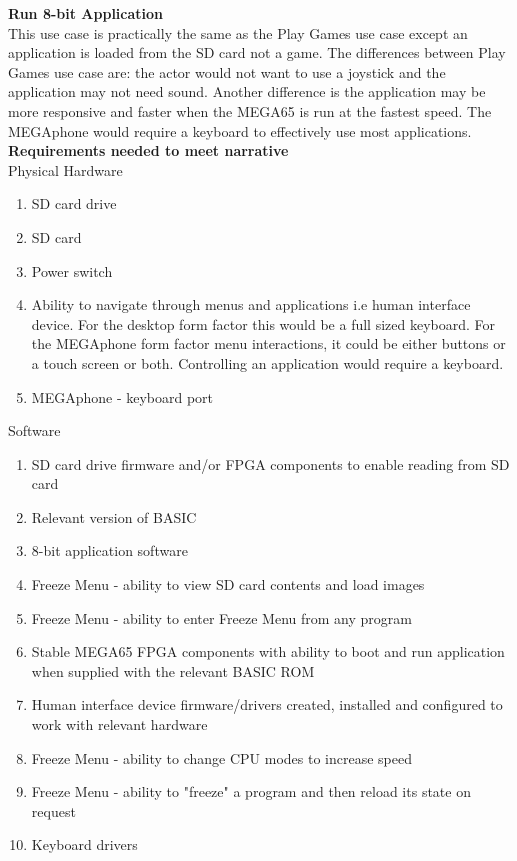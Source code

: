 \textbf{Run 8-bit Application}\\
This use case is practically the same as the Play Games use case except an application is loaded from the SD card not a game. The differences between Play Games use case are: the actor would not want to use a joystick and the application may not need sound. Another difference is the application may be more responsive and faster when the MEGA65 is run at the fastest speed. The MEGAphone would require a keyboard to effectively use most applications.\\

\textbf{Requirements needed to meet narrative}\\
Physical Hardware
\begin{enumerate}
\item SD card drive
\item SD card
\item Power switch
\item Ability to navigate through menus and applications i.e human interface device. For the desktop form factor this would be a full sized keyboard. For the MEGAphone form factor menu interactions, it could be either buttons or a touch screen or both. Controlling an application would require a keyboard.
\item MEGAphone - keyboard port
\end{enumerate}

Software\\
\begin{enumerate}
\item SD card drive firmware and/or FPGA components to enable reading from SD card
\item Relevant version of BASIC 
\item 8-bit application software
\item Freeze Menu - ability to view SD card contents and load images
\item Freeze Menu - ability to enter Freeze Menu from any program
\item Stable MEGA65 FPGA components with ability to boot and run application when supplied with the relevant BASIC ROM
\item Human interface device firmware/drivers created, installed and configured to work with relevant hardware
\item Freeze Menu - ability to change CPU modes to increase speed
\item Freeze Menu - ability to "freeze" a program and then reload its state on request
\item Keyboard drivers
\end{enumerate}

